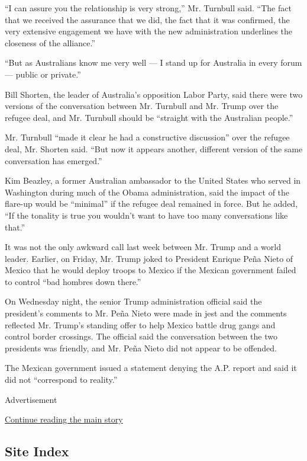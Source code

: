 ``I can assure you the relationship is very strong,'' Mr. Turnbull said.
``The fact that we received the assurance that we did, the fact that it
was confirmed, the very extensive engagement we have with the new
administration underlines the closeness of the alliance.''

``But as Australians know me very well --- I stand up for Australia in
every forum --- public or private.''

Bill Shorten, the leader of Australia's opposition Labor Party, said
there were two versions of the conversation between Mr. Turnbull and Mr.
Trump over the refugee deal, and Mr. Turnbull should be ``straight with
the Australian people.''

Mr. Turnbull ``made it clear he had a constructive discussion'' over the
refugee deal, Mr. Shorten said. ``But now it appears another, different
version of the same conversation has emerged.''

Kim Beazley, a former Australian ambassador to the United States who
served in Washington during much of the Obama administration, said the
impact of the flare-up would be ``minimal'' if the refugee deal remained
in force. But he added, ``If the tonality is true you wouldn't want to
have too many conversations like that.''

It was not the only awkward call last week between Mr. Trump and a world
leader. Earlier, on Friday, Mr. Trump joked to President Enrique Peña
Nieto of Mexico that he would deploy troops to Mexico if the Mexican
government failed to control ``bad hombres down there.''

On Wednesday night, the senior Trump administration official said the
president's comments to Mr. Peña Nieto were made in jest and the
comments reflected Mr. Trump's standing offer to help Mexico battle drug
gangs and control border crossings. The official said the conversation
between the two presidents was friendly, and Mr. Peña Nieto did not
appear to be offended.

The Mexican government issued a statement denying the A.P. report and
said it did not ``correspond to reality.''

Advertisement

\protect\hyperlink{after-bottom}{Continue reading the main story}

\hypertarget{site-index}{%
\subsection{Site Index}\label{site-index}}

